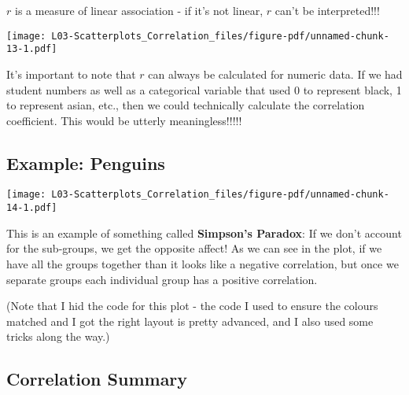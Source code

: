 \documentclass[
  letterpaper,
  DIV=11,
  numbers=noendperiod]{scrreprt}
\begin{document}
\(r\) is a measure of linear association - if it's not linear, \(r\)
can't be interpreted!!!

\texttt{[image: L03-Scatterplots\_Correlation\_files/figure-pdf/unnamed-chunk-13-1.pdf]}

It's important to note that \(r\) can always be calculated for numeric
data. If we had student numbers as well as a categorical variable that
used 0 to represent black, 1 to represent asian, etc., then we could
technically calculate the correlation coefficient. This would be utterly
meaningless!!!!!

\hypertarget{example-penguins}{%
\subsection{Example: Penguins}\label{example-penguins}}

\texttt{[image: L03-Scatterplots\_Correlation\_files/figure-pdf/unnamed-chunk-14-1.pdf]}

This is an example of something called \textbf{Simpson's Paradox}: If we
don't account for the sub-groups, we get the opposite affect! As we can
see in the plot, if we have all the groups together than it looks like a
negative correlation, but once we separate groups each individual group
has a positive correlation.

(Note that I hid the code for this plot - the code I used to ensure the
colours matched and I got the right layout is pretty advanced, and I
also used some tricks along the way.)

\hypertarget{correlation-summary}{%
\subsection{Correlation Summary}\label{correlation-summary}}
\end{document}
